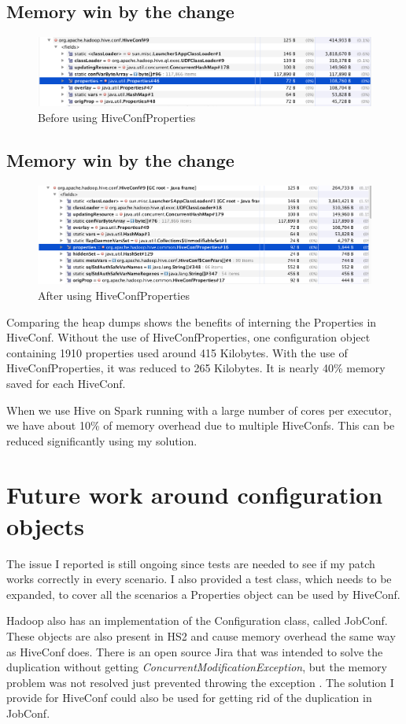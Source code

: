 \subsection{Memory win by the change}
\begin{figure}[H]
	\includegraphics[width=150mm, keepaspectratio]{figures/hiveconf_orig.png}
	\centering
	\caption{Before using HiveConfProperties}
\end{figure}

\subsection{Memory win by the change}
\begin{figure}[H]
	\includegraphics[width=150mm, keepaspectratio]{figures/hiveconf_interned.png}
	\centering
	\caption{After using HiveConfProperties}
\end{figure}

Comparing the heap dumps shows the benefits of interning the Properties in HiveConf. Without the use of HiveConfProperties, one configuration object containing 1910 properties used around 415 Kilobytes. With the use of HiveConfProperties, it was reduced to 265 Kilobytes. It is nearly 40\% memory saved for each HiveConf. 

When we use Hive on Spark running with a large number of cores per executor, we have about 10\% of memory overhead due to multiple HiveConfs. This can be reduced significantly using my solution. 

\section{Future work around configuration objects}
The issue I reported is still ongoing since tests are needed to see if my patch works correctly in every scenario. I also provided a test class, which needs to be expanded, to cover all the scenarios a Properties object can be used by HiveConf. 

Hadoop also has an implementation of the Configuration class, called JobConf. These objects are also present in HS2 and cause memory overhead the same way as HiveConf does. There is an open source Jira that was intended to solve the duplication without getting \textit{ConcurrentModificationException}, but the memory problem was not resolved just prevented throwing the exception \cite{hive-jobconf}. The solution I provide for HiveConf could also be used for getting rid of the duplication in JobConf.